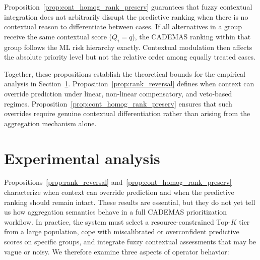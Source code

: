 \documentclass[mathematics,article,submit,moreauthors]{Definitions/mdpi}
\begin{document}
Proposition~\ref{prop:cont_homog_rank_preserv} guarantees that fuzzy contextual integration does not arbitrarily disrupt the predictive ranking when there is no contextual reason to differentiate between cases. If all alternatives in a group receive the same contextual score ($Q_i = q$), the CADEMAS ranking within that group follows the ML risk hierarchy exactly. Contextual modulation then affects the absolute priority level but not the relative order among equally treated cases.

Together, these propositions establish the theoretical bounds for the empirical analysis in Section~\ref{sect:simulation}. Proposition~\ref{prop:rank_reversal} defines when context can override prediction under linear, non-linear compensatory, and veto-based regimes. Proposition~\ref{prop:cont_homog_rank_preserv} ensures that such overrides require genuine contextual differentiation rather than arising from the aggregation mechanism alone. 

\section{Experimental analysis}\label{sect:simulation}

Propositions~\ref{prop:rank_reversal} and~\ref{prop:cont_homog_rank_preserv} characterize when context can override prediction and when the predictive ranking should remain intact. These results are essential, but they do not yet tell us how aggregation semantics behave in a full CADEMAS prioritization workflow. In practice, the system must select a resource-constrained Top-$K$ tier from a large population, cope with miscalibrated or overconfident predictive scores on specific groups, and integrate fuzzy contextual assessments that may be vague or noisy. We therefore examine three aspects of operator behavior:
\end{document}
